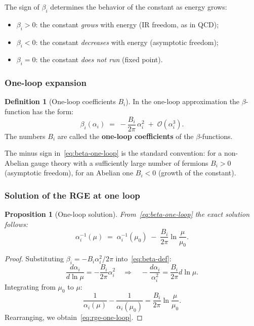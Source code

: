 \documentclass[11pt,a4paper]{article}
\newtheorem{proposition}[theorem]{Proposition}
\theoremstyle{definition}
\newtheorem{definition}[theorem]{Definition}
\begin{document}
\medskip\noindent
The sign of $\beta_i$ determines the behavior of the constant as energy grows:
\begin{itemize}
    \item $\beta_i > 0$: the constant \emph{grows} with energy
          (IR freedom, as in QCD);
    \item $\beta_i < 0$: the constant \emph{decreases} with energy
          (asymptotic freedom);
    \item $\beta_i = 0$: the constant \emph{does not run} (fixed point).
\end{itemize}

\subsubsection{One-loop expansion}

\begin{definition}[One-loop coefficients $B_i$]
\label{def:Bi}
In the one-loop approximation the $\beta$-function has the form:
\begin{equation}
    \beta_i(\alpha_i) \;=\; -\frac{B_i}{2\pi}\,\alpha_i^2
    \;+\; \mathcal{O}(\alpha_i^3).
    \label{eq:beta-one-loop}
\end{equation}
The numbers $B_i$ are called the \textbf{one-loop coefficients}
of the $\beta$-functions.
\end{definition}

\medskip\noindent
The minus sign in~\eqref{eq:beta-one-loop} is the standard convention:
for a non-Abelian gauge theory with a sufficiently large number of
fermions $B_i > 0$ (asymptotic freedom), for an Abelian one
$B_i < 0$ (growth of the constant).

\subsubsection{Solution of the RGE at one loop}

\begin{proposition}[One-loop solution]
\label{prop:rge-one-loop}
From~\eqref{eq:beta-one-loop} the exact solution follows:
\begin{equation}
    \boxed{
    \alpha_i^{-1}(\mu) \;=\; \alpha_i^{-1}(\mu_0)
    \;-\; \frac{B_i}{2\pi} \ln\frac{\mu}{\mu_0}.
    }
    \label{eq:rge-one-loop}
\end{equation}
\end{proposition}

\begin{proof}
Substituting $\beta_i = -B_i \alpha_i^2 / 2\pi$ into~\eqref{eq:beta-def}:
\begin{equation}
    \frac{d\alpha_i}{d \ln\mu} = -\frac{B_i}{2\pi} \alpha_i^2
    \quad\Longrightarrow\quad
    -\frac{d\alpha_i}{\alpha_i^2} = \frac{B_i}{2\pi} d \ln\mu.
\end{equation}
Integrating from $\mu_0$ to $\mu$:
\begin{equation}
    \frac{1}{\alpha_i(\mu)} - \frac{1}{\alpha_i(\mu_0)}
    = \frac{B_i}{2\pi} \ln\frac{\mu}{\mu_0}.
\end{equation}
Rearranging, we obtain~\eqref{eq:rge-one-loop}.
\end{proof}
\end{document}
